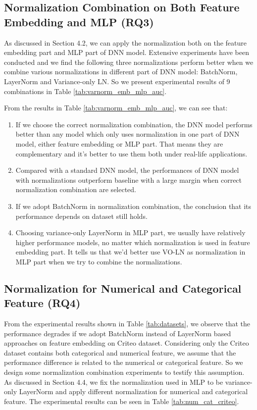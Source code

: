 \documentclass[sigconf]{acmart}
\begin{document}
\subsection{Normalization Combination on Both Feature Embedding and MLP (RQ3)}
As discussed in Section 4.2, we can apply the normalization both on the feature embedding part and MLP part of DNN model. Extensive experiments have been conducted and we find the following three normalizations perform better when we combine various normalizations in different part of DNN model: BatchNorm, LayerNorm and Variance-only LN. So we present  experimental results of 9 combinations in Table \ref{tab:varnorm_emb_mlp_auc}.


From the results in Table \ref{tab:varnorm_emb_mlp_auc}, we can see that:
\begin{enumerate}
  \item  If we choose the correct normalization combination, the DNN model performs better than any model which only uses normalization in one part of DNN model, either feature embedding or MLP part. That means they are complementary and it's better to use them both under real-life applications.
  \item  Compared with a standard DNN model, the performances of DNN model with normalizations outperform baseline with a large margin when correct normalization combination are selected.
  \item  If we adopt BatchNorm in normalization combination, the conclusion that its performance depends on dataset still holds.
  \item  Choosing variance-only LayerNorm in MLP part, we usually have relatively higher performance models, no matter which normalization is used in feature embedding part. It tells us that we'd better use VO-LN as  normalization in MLP part when we try to combine the normalizations.
 \end{enumerate}




\subsection{Normalization for Numerical and Categorical Feature (RQ4)}
From the experimental results shown in Table \ref{tab:datasets}, we observe that the performance degrades if we adopt BatchNorm instead of LayerNorm based approaches on feature embedding on Criteo dataset. Considering only the Criteo dataset contains both categorical and numerical feature, we assume that the performance difference is related to the numerical or categorical feature. So we design some normalization combination experiments to testify this assumption. As discussed in Section 4.4, we fix the normalization used in MLP to be variance-only LayerNorm and apply different normalization for numerical and categorical feature. The experimental results can be seen in Table \ref{tab:num_cat_criteo}.
\end{document}
